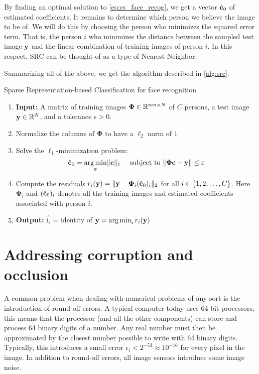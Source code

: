 By finding an optimal solution to \eqref{eq:cs_face_recog}, we get a vector $ \hat{\mathbf{c}}_{0} $ of estimated coefficients. It remains to determine which person we believe the image to be of. We will do this by choosing the person who minimizes the squared error term. That is, the person $ i $ who minimizes the distance between the sampled test image $ \mathbf{y} $ and the linear combination of training images of person $ i $. In this respect, SRC can be thought of as a type of Nearest Neighbor. 

Summarizing all of the above, we get the algorithm described in \cref{alg:src}. 



\begin{algorithm}[t]
	\caption{Sparse Representation-based Classification for face recognition}
	\label{alg:src}
	\begin{enumerate}
		\itemsep0em 
		\renewcommand{\parsep}{0pt}
		\renewcommand{\parskip}{0pt}
		\renewcommand{\itemsep}{0pt}
		\item[] \textbf{Input:} A matrix of training images $ \mathbf{\Phi} \in \mathbb{R}^{mn\times N} $ of $ C $ persons, a test image $ \mathbf{y}\in\mathbb{R}^{N} $, and a tolerance $ \epsilon > 0 $.
		\item Normalize the columns of $ \mathbf{\Phi} $ to have a $ \ell_{2} $ norm of $ 1 $
		\item Solve the $ \ell_{1} $-minimization problem:
		\[
			\hat{\mathbf{c}}_{0} = \operatorname*{arg\,min}_{\mathbf{c}} \lVert\mathbf{c}\rVert_{1} ~\quad\text{subject to}~ \lVert\mathbf{\Phi}\mathbf{c} - \mathbf{y}\rVert \leq \varepsilon
		\]
		\item Compute the residuals $ r_{i}(\mathbf{y}) = \lVert\mathbf{y} - \mathbf{\Phi}_{i}(\hat{\mathbf{c}}_{0})_{i}\rVert_{2} $ for all $ i \in \{1, 2, \ldots, C\} $. Here $ \mathbf{\Phi}_{i} $ and $ (\hat{\mathbf{c}}_{0})_{i} $ denotes all the training images and estimated coefficients associated with person $ i $. 
		\item[] \textbf{Output:} $ \hat{l_{i}} $ = identity of $ \mathbf{y} = \operatorname*{arg\,min}_{i} r_{i}(\mathbf{y}) $  
	\end{enumerate}
\end{algorithm}


\section{Addressing corruption and occlusion}
A common problem when dealing with numerical problems of any sort is the introduction of round-off errors. A typical computer today uses 64 bit processors, this means that the processor (and all the other components) can store and process 64 binary digits of a number. Any real number must then be approximated by the closest number possible to write with 64 binary digits. Typically, this introduces a small error $ \epsilon_{i} < 2^{-53} \approx 10^{-16} $ for every pixel in the image. In addition to round-off errors, all image sensors introduce some image noise. 

